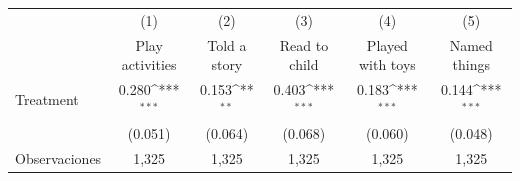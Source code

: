 {
\def\sym#1{\ifmmode^{#1}\else\(^{#1}\)\fi}
\begin{tabular}{l*{5}{c}}
\toprule
                    &\multicolumn{1}{c}{(1)}&\multicolumn{1}{c}{(2)}&\multicolumn{1}{c}{(3)}&\multicolumn{1}{c}{(4)}&\multicolumn{1}{c}{(5)}\\
                    &\multicolumn{1}{c}{Play activities}&\multicolumn{1}{c}{Told a story}&\multicolumn{1}{c}{Read to child}&\multicolumn{1}{c}{Played with toys}&\multicolumn{1}{c}{Named things}\\
\midrule
Treatment           &       0.280\sym{***}&       0.153\sym{**} &       0.403\sym{***}&       0.183\sym{***}&       0.144\sym{***}\\
                    &     (0.051)         &     (0.064)         &     (0.068)         &     (0.060)         &     (0.048)         \\
\midrule
Observaciones       &       1,325         &       1,325         &       1,325         &       1,325         &       1,325         \\
\bottomrule
\end{tabular}
}
